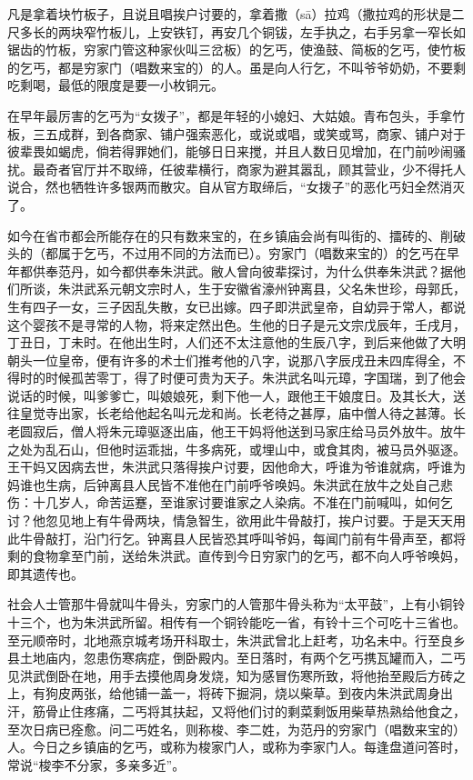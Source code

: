 \documentclass[12pt,UTF8]{ctexbook}
\begin{document}
凡是拿着块竹板子，且说且唱挨户讨要的，拿着撒（sā）拉鸡（撒拉鸡的形状是二尺多长的两块窄竹板儿，上安铁钉，再安几个铜钹，左手执之，右手另拿一窄长如锯齿的竹板，穷家门管这种家伙叫三岔板）的乞丐，使渔鼓、简板的乞丐，使竹板的乞丐，都是穷家门（唱数来宝的）的人。虽是向人行乞，不叫爷爷奶奶，不要剩吃剩喝，最低的限度是要一小枚铜元。

在早年最厉害的乞丐为“女拨子”，都是年轻的小媳妇、大姑娘。青布包头，手拿竹板，三五成群，到各商家、铺户强索恶化，或说或唱，或笑或骂，商家、铺户对于彼辈畏如蝎虎，倘若得罪她们，能够日日来搅，并且人数日见增加，在门前吵闹骚扰。最奇者官厅并不取缔，任彼辈横行，商家为避其嚣乱，顾其营业，少不得托人说合，然也牺牲许多银两而散灾。自从官方取缔后，“女拨子”的恶化丐妇全然消灭了。

如今在省市都会所能存在的只有数来宝的，在乡镇庙会尚有叫街的、擂砖的、削破头的（都属于乞丐，不过用不同的方法而已）。穷家门（唱数来宝的）的乞丐在早年都供奉范丹，如今都供奉朱洪武。敝人曾向彼辈探讨，为什么供奉朱洪武？据他们所谈，朱洪武系元朝文宗时人，生于安徽省濠州钟离县，父名朱世珍，母郭氏，生有四子一女，三子因乱失散，女已出嫁。四子即洪武皇帝，自幼异于常人，都说这个婴孩不是寻常的人物，将来定然出色。生他的日子是元文宗戊辰年，壬戌月，丁丑日，丁未时。在他出生时，人们还不太注意他的生辰八字，到后来他做了大明朝头一位皇帝，便有许多的术士们推考他的八字，说那八字辰戌丑未四库得全，不得时的时候孤苦零丁，得了时便可贵为天子。朱洪武名叫元璋，字国瑞，到了他会说话的时候，叫爹爹亡，叫娘娘死，剩下他一人，跟他王干娘度日。及其长大，送往皇觉寺出家，长老给他起名叫元龙和尚。长老待之甚厚，庙中僧人待之甚薄。长老圆寂后，僧人将朱元璋驱逐出庙，他王干妈将他送到马家庄给马员外放牛。放牛之处为乱石山，但他时运乖拙，牛多病死，或埋山中，或食其肉，被马员外驱逐。王干妈又因病去世，朱洪武只落得挨户讨要，因他命大，呼谁为爷谁就病，呼谁为妈谁也生病，后钟离县人民皆不准他在门前呼爷唤妈。朱洪武在放牛之处自己悲伤：十几岁人，命苦运蹇，至谁家讨要谁家之人染病。不准在门前喊叫，如何乞讨？他忽见地上有牛骨两块，情急智生，欲用此牛骨敲打，挨户讨要。于是天天用此牛骨敲打，沿门行乞。钟离县人民皆恐其呼叫爷妈，每闻门前有牛骨声至，都将剩的食物拿至门前，送给朱洪武。直传到今日穷家门的乞丐，都不向人呼爷唤妈，即其遗传也。

社会人士管那牛骨就叫牛骨头，穷家门的人管那牛骨头称为“太平鼓”，上有小铜铃十三个，也为朱洪武所留。相传有一个铜铃能吃一省，有铃十三个可吃十三省也。至元顺帝时，北地燕京城考场开科取士，朱洪武曾北上赶考，功名未中。行至良乡县土地庙内，忽患伤寒病症，倒卧殿内。至日落时，有两个乞丐携瓦罐而入，二丐见洪武倒卧在地，用手去摸他周身发烧，知为感冒伤寒所致，将他抬至殿后方砖之上，有狗皮两张，给他铺一盖一，将砖下掘洞，烧以柴草。到夜内朱洪武周身出汗，筋骨止住疼痛，二丐将其扶起，又将他们讨的剩菜剩饭用柴草热熟给他食之，至次日病已痊愈。问二丐姓名，则称梭、李二姓，为范丹的穷家门（唱数来宝的）人。今日之乡镇庙的乞丐，或称为梭家门人，或称为李家门人。每逢盘道问答时，常说“梭李不分家，多亲多近”。
\end{document}
